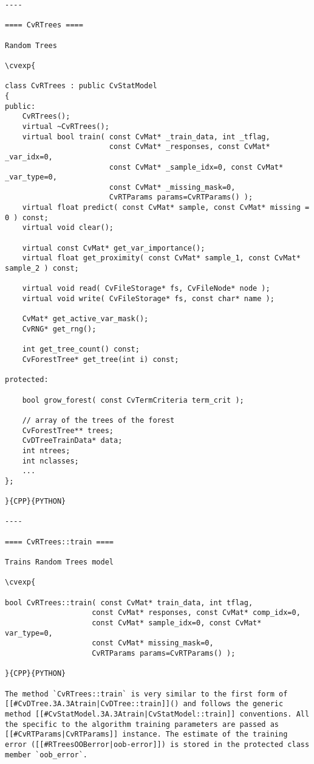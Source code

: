 \begin{verbatim}
----

==== CvRTrees ====

Random Trees

\cvexp{

class CvRTrees : public CvStatModel
{
public:
    CvRTrees();
    virtual ~CvRTrees();
    virtual bool train( const CvMat* _train_data, int _tflag,
                        const CvMat* _responses, const CvMat* _var_idx=0,
                        const CvMat* _sample_idx=0, const CvMat* _var_type=0,
                        const CvMat* _missing_mask=0,
                        CvRTParams params=CvRTParams() );
    virtual float predict( const CvMat* sample, const CvMat* missing = 0 ) const;
    virtual void clear();

    virtual const CvMat* get_var_importance();
    virtual float get_proximity( const CvMat* sample_1, const CvMat* sample_2 ) const;

    virtual void read( CvFileStorage* fs, CvFileNode* node );
    virtual void write( CvFileStorage* fs, const char* name );

    CvMat* get_active_var_mask();
    CvRNG* get_rng();

    int get_tree_count() const;
    CvForestTree* get_tree(int i) const;

protected:

    bool grow_forest( const CvTermCriteria term_crit );

    // array of the trees of the forest
    CvForestTree** trees;
    CvDTreeTrainData* data;
    int ntrees;
    int nclasses;
    ...
};

}{CPP}{PYTHON}

----

==== CvRTrees::train ====

Trains Random Trees model

\cvexp{

bool CvRTrees::train( const CvMat* train_data, int tflag,
                    const CvMat* responses, const CvMat* comp_idx=0,
                    const CvMat* sample_idx=0, const CvMat* var_type=0,
                    const CvMat* missing_mask=0,
                    CvRTParams params=CvRTParams() );

}{CPP}{PYTHON}

The method `CvRTrees::train` is very similar to the first form of [[#CvDTree.3A.3Atrain|CvDTree::train]]() and follows the generic method [[#CvStatModel.3A.3Atrain|CvStatModel::train]] conventions. All the specific to the algorithm training parameters are passed as [[#CvRTParams|CvRTParams]] instance. The estimate of the training error ([[#RTreesOOBerror|oob-error]]) is stored in the protected class member `oob_error`.


\end{verbatim}
